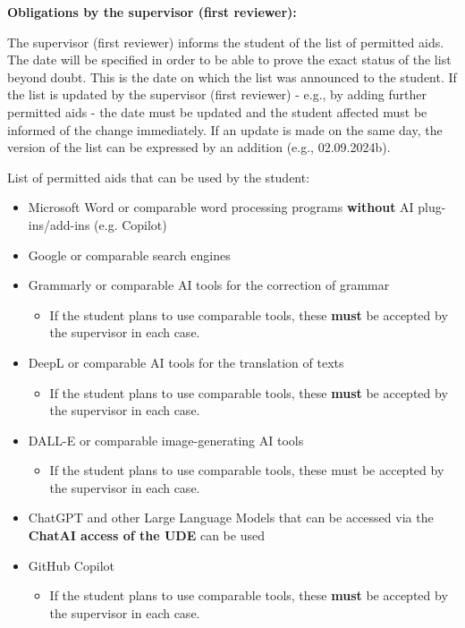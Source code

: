 
\vspace{0.3cm}
\textbf{Obligations by the supervisor (first reviewer):}

The supervisor (first reviewer) informs the student of the list of permitted aids. The date will be specified in order to be able to prove the exact status of the list beyond doubt. This is the date on which the list was announced to the student. If the list is updated by the supervisor (first reviewer) - e.g., by adding further permitted aids - the date must be updated and the student affected must be informed of the change immediately. If an update is made on the same day, the version of the list can be expressed by an addition (e.g., 02.09.2024b).

List of permitted aids that can be used by the student: 

\begin{itemize}[topsep=0pt,itemsep=-1ex,partopsep=0ex,parsep=1ex]
    \item Microsoft Word or comparable word processing programs \textbf{without} AI plug-ins/add-ins (e.g. Copilot)
    \item Google or comparable search engines
    \item Grammarly or comparable AI tools for the correction of grammar
    \begin{itemize}
        \item If the student plans to use comparable tools, these \textbf{must} be accepted by the supervisor in each case.
    \end{itemize}
    \item DeepL or comparable AI tools for the translation of texts
    \begin{itemize}
        \item If the student plans to use comparable tools, these \textbf{must} be accepted by the supervisor in each case.
    \end{itemize}
    \item DALL-E or comparable image-generating AI tools
    \begin{itemize}
        \item If the student plans to use comparable tools, these must be accepted by the supervisor in each case.
    \end{itemize}
    \item ChatGPT and other Large Language Models that can be accessed via the \textbf{ChatAI access of the UDE} can be used
    \item GitHub Copilot
    \begin{itemize}
        \item If the student plans to use comparable tools, these \textbf{must} be accepted by the supervisor in each case.
    \end{itemize}
\end{itemize}

